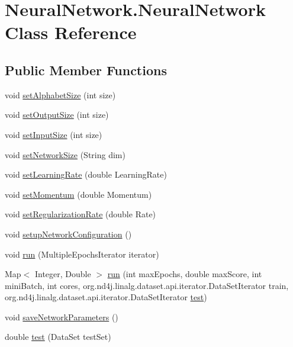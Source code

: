 \hypertarget{class_neural_network_1_1_neural_network}{}\section{Neural\+Network.\+Neural\+Network Class Reference}
\label{class_neural_network_1_1_neural_network}
\subsection*{Public Member Functions}
\begin{DoxyCompactItemize}
\item 
void \hyperlink{class_neural_network_1_1_neural_network_a4142c49f189728d8cb872bdf3fabd609}{set\+Alphabet\+Size} (int size)
\item 
void \hyperlink{class_neural_network_1_1_neural_network_a95f6363eed82945458fc9c8ec1f3db83}{set\+Output\+Size} (int size)
\item 
void \hyperlink{class_neural_network_1_1_neural_network_a27eefccc0cee9d7e594d59ea04028395}{set\+Input\+Size} (int size)
\item 
void \hyperlink{class_neural_network_1_1_neural_network_ad14d8b4bd87dfe446ea3f40f44433e51}{set\+Network\+Size} (String dim)
\item 
void \hyperlink{class_neural_network_1_1_neural_network_a6ea743619d1ba6147f888ba5924e585b}{set\+Learning\+Rate} (double Learning\+Rate)
\item 
void \hyperlink{class_neural_network_1_1_neural_network_ae1a126eb205b6d240dac3ac7aded9fb1}{set\+Momentum} (double Momentum)
\item 
void \hyperlink{class_neural_network_1_1_neural_network_ae1573444e1108f1d821a53816d98e6af}{set\+Regularization\+Rate} (double Rate)
\item 
void \hyperlink{class_neural_network_1_1_neural_network_a646f8b0673607cf99746f17a70e3f8ed}{setup\+Network\+Configuration} ()
\item 
void \hyperlink{class_neural_network_1_1_neural_network_aaba587c903d93ae817db303eb9ab0ac9}{run} (Multiple\+Epochs\+Iterator iterator)
\item 
Map$<$ Integer, Double $>$ \hyperlink{class_neural_network_1_1_neural_network_af9fb6bf62b81865fbdc35f9e0cafa638}{run} (int max\+Epochs, double max\+Score, int mini\+Batch, int cores, org.\+nd4j.\+linalg.\+dataset.\+api.\+iterator.\+Data\+Set\+Iterator train, org.\+nd4j.\+linalg.\+dataset.\+api.\+iterator.\+Data\+Set\+Iterator \hyperlink{class_neural_network_1_1_neural_network_a66774dd8ee622aca4275c19524802726}{test})
\item 
void \hyperlink{class_neural_network_1_1_neural_network_a3a37941eb4cccd5ee66bcd0c38adac03}{save\+Network\+Parameters} ()
\item 
double \hyperlink{class_neural_network_1_1_neural_network_a66774dd8ee622aca4275c19524802726}{test} (Data\+Set test\+Set)
\end{DoxyCompactItemize}
